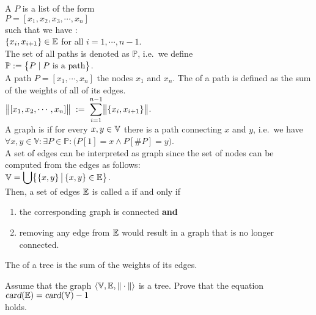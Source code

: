 \noindent
A  $P$ is a list of the form 
\\[0.2cm]
\hspace*{1.3cm} 
$P = [ x_1, x_2, x_3, \cdots, x_n ]$ 
\\[0.2cm]
such that we have : \\[0.2cm]
\hspace*{1.3cm}
$\{x_i,x_{i+1}\} \in {\mathbb E}$  \quad for all $i = 1, \cdots, n-1$.
\\[0.2cm]
The set of all paths is denoted as $\mathbb{P}$, i.e.~we define
\\[0.2cm]
\hspace*{1.3cm}
$\displaystyle \mathbb{P}  := \bigl\{ P \mid \mbox{$P$ is a path} \bigr\}$.
\\[0.2cm]
A path $P = [ x_1, \cdots, x_n]$  the nodes $x_1$ and $x_n$.  The  of a path is defined as
the sum of the weights of all of its edges.  
\\[0.2cm]
\hspace*{1.3cm}
 $\displaystyle\bigl\|[x_1,x_2, \cdots, x_n]\bigr\| \;:=\; \sum\limits_{i=1}^{n-1} \bigl\|\{x_i,x_{i+1}\}\bigr\|$. 
\\[0.2cm]
A graph is  if for every $x,y \in {\mathbb V}$ there is a path connecting $x$ and $y$, i.e.~we have
\\[0.2cm]
\hspace*{1.3cm}
$\forall x, y \in \mathbb{V}: \exists P \in \mathbb{P}: \bigl(P[1] = x \wedge P[\#P] = y\bigr)$.
\\[0.2cm]
A set of edges can be interpreted as graph since the set of nodes can be computed from the edges as
follows: 
\\[0.2cm]
\hspace*{1.3cm}
$\displaystyle{\mathbb V} = \bigcup \bigl\{\{x,y\} \,\big|\, \{x,y\} \in {\mathbb E} \bigr\}$.
\\[0.2cm]
Then, a set of edges ${\mathbb E}$ is called a  if and only if
\begin{enumerate}
\item the corresponding graph is connected \quad \textbf{and}
\item removing any edge from ${\mathbb E}$ would result in a graph that is no longer connected.
\end{enumerate}
The  of a tree is the sum of the weights of its edges.

\exercise
Assume that the graph $\langle {\mathbb V}, {\mathbb E}, \|\cdot\|\rangle$ is a tree.  Prove that the equation
\\[0.2cm]
\hspace*{1.3cm}
$\textsl{card}({\mathbb E}) = \textsl{card}({\mathbb V}) - 1$
\\[0.2cm]
holds.  
\vspace*{0.2cm}

